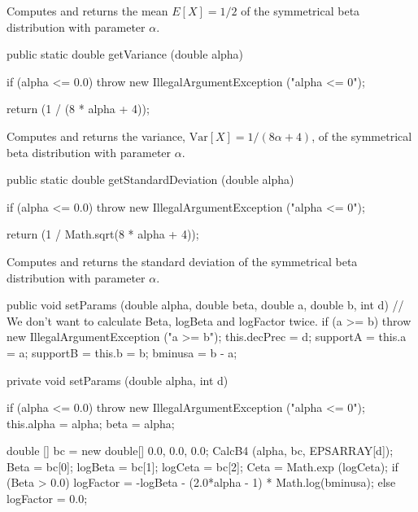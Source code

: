 \begin{tabb}  Computes and returns the mean $E[X] = 1/2$ of the symmetrical beta
   distribution with parameter $\alpha$.
\end{tabb}
\begin{htmlonly}
\end{htmlonly}
\begin{code}

   public static double getVariance (double alpha)\begin{hide} {
      if (alpha <= 0.0)
         throw new IllegalArgumentException ("alpha <= 0");

      return (1 / (8 * alpha + 4));
   }\end{hide}
\end{code}
\begin{tabb}  Computes and returns the variance, $\mbox{Var}[X] = 1/(8\alpha + 4)$,
   of the symmetrical beta distribution with parameter $\alpha$.
\end{tabb}
\begin{htmlonly}
\end{htmlonly}
\begin{code}

   public static double getStandardDeviation (double alpha)\begin{hide} {
      if (alpha <= 0.0)
         throw new IllegalArgumentException ("alpha <= 0");

      return (1 / Math.sqrt(8 * alpha + 4));
   }\end{hide}
\end{code}
\begin{tabb}  Computes and returns the standard deviation of the
   symmetrical beta distribution with parameter $\alpha$.
\end{tabb}
\begin{htmlonly}
\end{htmlonly}
\begin{code}\begin{hide}

   public void setParams (double alpha, double beta, double a, double b, int d) {
      // We don't want to calculate Beta, logBeta and logFactor twice.
      if (a >= b)
         throw new IllegalArgumentException ("a >= b");
      this.decPrec = d;
      supportA = this.a = a;
      supportB = this.b = b;
      bminusa = b - a;
    }

   private void setParams (double alpha, int d) {
      if (alpha <= 0.0)
         throw new IllegalArgumentException ("alpha <= 0");
      this.alpha = alpha;
      beta = alpha;

      double [] bc = new double[] {0.0, 0.0, 0.0};
      CalcB4 (alpha, bc, EPSARRAY[d]);
      Beta = bc[0]; logBeta = bc[1]; logCeta = bc[2];
      Ceta = Math.exp (logCeta);
      if (Beta > 0.0)
         logFactor = -logBeta - (2.0*alpha - 1) * Math.log(bminusa);
      else
         logFactor = 0.0;
    }\end{hide}
\end{code}
